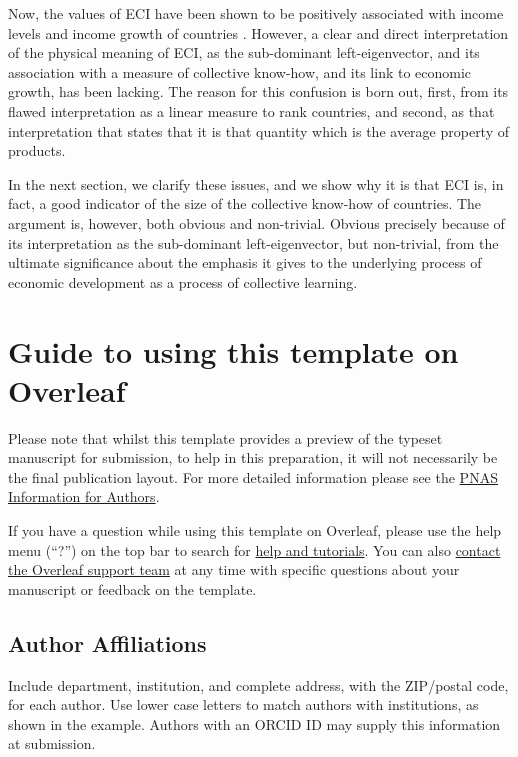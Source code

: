 \documentclass[9pt,twocolumn,twoside,lineno]{pnas-new}
\begin{document}
Now, the values of ECI have been shown to be positively associated with income levels and income growth of countries \cite{Hidalgo_2009}. However, a clear and direct interpretation of the physical meaning of ECI, as the sub-dominant left-eigenvector, and its association with a measure of collective know-how, and its link to economic growth, has been lacking. The reason for this confusion is born out, first, from its flawed interpretation as a linear measure to rank countries, and second, as that interpretation that states that it is that quantity which is the average property of products.

In the next section, we clarify these issues, and we show why it is that ECI is, in fact, a good indicator of the size of the collective know-how of countries. The argument is, however, both obvious and non-trivial. Obvious precisely because of its interpretation as the sub-dominant left-eigenvector, but non-trivial, from the ultimate significance about the emphasis it gives to the underlying process of economic development as a process of collective learning.




\section*{Guide to using this template on Overleaf}

Please note that whilst this template provides a preview of the typeset manuscript for submission, to help in this preparation, it will not necessarily be the final publication layout. For more detailed information please see the \href{http://www.pnas.org/site/authors/format.xhtml}{PNAS Information for Authors}.

If you have a question while using this template on Overleaf, please use the help menu (``?'') on the top bar to search for \href{https://www.overleaf.com/help}{help and tutorials}. You can also \href{https://www.overleaf.com/contact}{contact the Overleaf support team} at any time with specific questions about your manuscript or feedback on the template.

\subsection*{Author Affiliations}

Include department, institution, and complete address, with the ZIP/postal code, for each author. Use lower case letters to match authors with institutions, as shown in the example. Authors with an ORCID ID may supply this information at submission.
\end{document}
